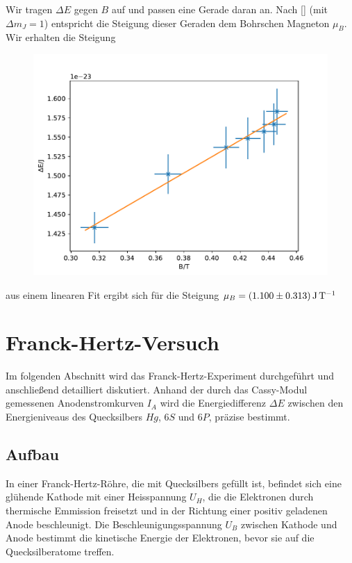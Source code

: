 \documentclass{article}
\newcommand{\defc}{black}
\newcommand{\colorT}[2][blue]{\color{#1}{#2}\color{\defc}}
\newcommand{\todo}[1]{\colorT[red]{\textbf{(#1)}}}
\renewcommand{\todo}[1]{}
\begin{document}
\begin{multicols}{2}
Wir tragen $\Delta E$ gegen $B$ auf und passen eine Gerade daran an. Nach \eqref{} (mit $\Delta m_J=1$)
entspricht die Steigung dieser Geraden dem Bohrschen Magneton $\mu_B$. Wir erhalten die Steigung
\todo{richtige Gleichung aufschreiben in Theorie}
\todo{weiter}



\begin{figure}[H]
  \centering
  \includegraphics[width=\linewidth]{energy_plot.pdf}
\end{figure}
aus einem linearen Fit ergibt sich für die Steigung
$\mu_B = \SI{1.1\pm 0.313}{\J\per\T}$



\clearpage
\section{Franck-Hertz-Versuch}
Im folgenden Abschnitt wird das Franck-Hertz-Experiment durchgeführt und anschließend detailliert 
diskutiert. Anhand der durch das Cassy-Modul gemessenen Anodenstromkurven \( I_A \) wird die 
Energiedifferenz \( \Delta E \) zwischen den Energieniveaus des Quecksilbers $Hg$, \( 6S \) und \( 6P \), 
präzise bestimmt.
\subsection{Aufbau}
In einer Franck-Hertz-Röhre, die mit Quecksilbers gefüllt ist, befindet sich eine glühende 
Kathode mit einer Heisspannung $U_H$, die die Elektronen durch thermische Emmission freisetzt und in der 
Richtung einer positiv geladenen Anode beschleunigt. Die Beschleunigungsspannung $U_B$ zwischen Kathode 
und Anode bestimmt die kinetische Energie der Elektronen, bevor sie auf die Quecksilberatome treffen.


\end{multicols}
\end{document}
